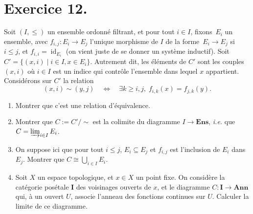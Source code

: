 \documentclass{../../td}
\newcommand\id{\ensuremath{\operatorname{id}}}
\begin{document}
  \chapter{Exercice 12.}
  \begin{slshape}
    \color{deepblue}

    Soit $(I, \le)$ un ensemble ordonné filtrant, et pour tout $i \in I$, fixons~$E_i$ un ensemble, avec $f_{i,j} : E_i \to E_j$ l'unique morphisme de $I$ de la forme~$E_i \to E_j$ si~$i \le j$, et $f_{i,i} = \id_{E_i}$ (on vient juste de se donner un système inductif). Soit~$C' = \{(x,i)  \mid i \in I, x \in E_i\}$.
    Autrement dit, les éléments de $C'$ sont les couples $(x,i)$ où  $i \in I$ est un indice qui contrôle l'ensemble dans lequel $x$ appartient.
    Considérons sur $C'$ la relation \[
      (x, i) \sim (y, j) \quad \iff \quad\exists k \ge i,j,\; f_{i,k}(x) = f_{j,k}(y)
    .\]
    \begin{enumerate}
      \item Montrer que c'est une relation d'équivalence.
      \item Montrer que  $C := C' / \sim$ est la colimite du diagramme $I \to \mathbf{Ens}$, \textit{i.e.} que $C = \varinjlim_{i \in I} E_i$.
      \item On suppose ici que pour tout $i \le j$, $E_i \subseteq E_j$ et $f_{i,j}$ est l'inclusion de $E_i$ dans $E_j$. Montrer que $C \cong \bigcup_{i \in  I} E_i$.
      \item Soit $X$ un espace topologique, et $x \in X$ un point fixe.
        On considère la catégorie posétale $\mathbf{I}$ des voisinages ouverts de $x$, et le diagramme $C : \mathbf{I} \to \mathbf{Ann}$ qui, à un ouvert $U$, associe l'anneau des fonctions continues sur $U$. Calculer la limite de ce diagramme.
    \end{enumerate}
  \end{slshape}
\end{document}
